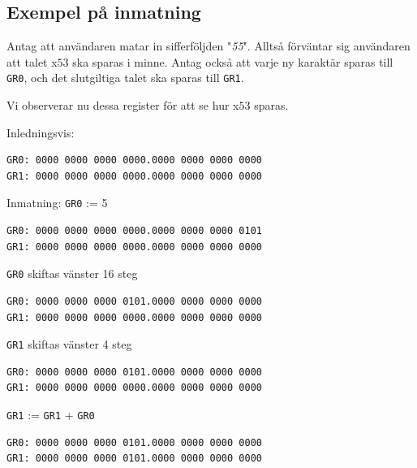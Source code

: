 \documentclass[]{article}
\begin{document}
\begin{appendices}
\section{Exempel på inmatning}\label{app:input_example}
Antag att användaren matar in sifferföljden "\textit{55}". Alltså förväntar sig användaren att talet x$53$ ska sparas i minne. Antag också att varje ny karaktär sparas till \texttt{GR0}, och det slutgiltiga talet ska sparas till \texttt{GR1}.

Vi observerar nu dessa register för att se hur x$53$ sparas.
\newline
\newline

Inledningsvis:
\begin{framed}
\begin{verbatim}
GR0: 0000 0000 0000 0000.0000 0000 0000 0000
GR1: 0000 0000 0000 0000.0000 0000 0000 0000
\end{verbatim}
\end{framed}

Inmatning: \texttt{GR0} := 5
\begin{framed}
\begin{verbatim}
GR0: 0000 0000 0000 0000.0000 0000 0000 0101
GR1: 0000 0000 0000 0000.0000 0000 0000 0000
\end{verbatim}
\end{framed}

\texttt{GR0} skiftas vänster 16 steg
\begin{framed}
\begin{verbatim}
GR0: 0000 0000 0000 0101.0000 0000 0000 0000
GR1: 0000 0000 0000 0000.0000 0000 0000 0000
\end{verbatim}
\end{framed}

\texttt{GR1} skiftas vänster 4 steg
\begin{framed}
\begin{verbatim}
GR0: 0000 0000 0000 0101.0000 0000 0000 0000
GR1: 0000 0000 0000 0000.0000 0000 0000 0000
\end{verbatim}
\end{framed}

\texttt{GR1} := \texttt{GR1} + \texttt{GR0}
\begin{framed}
\begin{verbatim}
GR0: 0000 0000 0000 0101.0000 0000 0000 0000
GR1: 0000 0000 0000 0101.0000 0000 0000 0000
\end{verbatim}
\end{framed}


\end{appendices}
\end{document}
